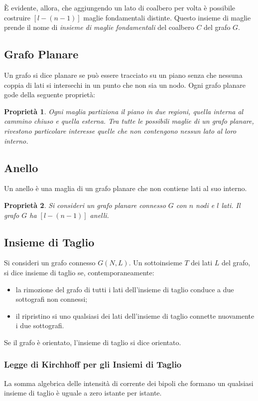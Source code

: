 \documentclass[a4paper]{report}
\newtheorem{prop}{Propriet\`a}
\begin{document}
\`E evidente, allora, che aggiungendo un lato di coalbero per volta
\`e possibile costruire $[l-(n-1)]$ maglie fondamentali
distinte. Questo insieme di maglie prende il nome di \emph{insieme di
  maglie fondamentali} del coalbero $C$ del grafo $G$.

\subsection{Grafo Planare}

Un grafo si dice planare se pu\`o essere tracciato su un piano senza
che nessuna coppia di lati si intersechi in un punto che non sia un
nodo.
Ogni grafo planare gode della seguente propriet\`a:

\begin{prop}
Ogni maglia partiziona il piano in due regioni, quella interna al
cammino chiuso e quella esterna. Tra tutte le possibili maglie di un
grafo planare, rivestono particolare interesse quelle che non
contengono nessun lato al loro interno.  
\end{prop}

\subsection{Anello}

Un anello \`e una maglia di un grafo planare che non contiene lati al
suo interno.

\begin{prop}
  Si consideri un grafo planare connesso $G$ con $n$ nodi e $l$
  lati. Il grafo $G$ ha $[l-(n-1)]$ anelli.
\end{prop}
\subsection{Insieme di Taglio}
Si consideri un grafo connesso $G(N, L)$. Un sottoinsieme $T$ dei lati
$L$ del grafo, si dice insieme di taglio se, contemporaneamente:
\begin{itemize}
\item la rimozione del grafo di tutti i lati dell'insieme di taglio
  conduce a due sottografi non connessi;
\item il ripristino si uno qualsiasi dei lati dell'insieme di taglio
  connette nuovamente i due sottografi.
\end{itemize}
Se il grafo \`e orientato, l'insieme di taglio si dice orientato.

\subsubsection{Legge di Kirchhoff per gli Insiemi di Taglio}
  La somma algebrica delle intensit\`a di corrente dei bipoli che
  formano un qualsiasi insieme di taglio \`e uguale a zero istante per
  istante.
\end{document}
